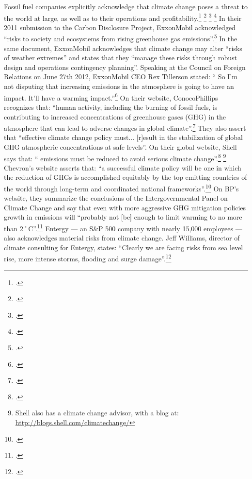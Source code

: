 
	

Fossil fuel companies explicitly acknowledge that climate change poses a threat to the world at large, as well as to their operations and profitability.\footcite[][]{FFcorpsPlanning} \footcite[][]{OilCosFearFI} \footcite[][]{DemiseOfCrudeDenial} \footcite[][]{DoTheOpposite}
In their 2011 submission to the Carbon Disclosure Project, ExxonMobil acknowledged ``risks to society and ecosystems from rising greenhouse gas emissions''.\footcite[][]{ExxonCDP2011}
In the same document, ExxonMobil acknowledges that climate change may alter ``risks of weather extremes'' and states that they ``manage these risks through robust design and operations contingency planning''.
Speaking at the Council on Foreign Relations on June 27th 2012, ExxonMobil CEO Rex Tillerson stated: `` So I'm not disputing that increasing  emissions in the atmosphere is going to have an impact. It'll have a warming impact.''\footcite[][]{Tillerson}
On their website, ConocoPhillips recognizes that: ``human activity, including the burning of fossil fuels, is contributing to increased concentrations of greenhouse gases (GHG) in the atmosphere that can lead to adverse changes in global climate''.\footcite[][]{ConocoPhillipsCC}
They also assert that ``effective climate change policy must... [r]esult in the stabilization of global GHG atmospheric concentrations at safe levels''.
On their global website, Shell says that: `` emissions must be reduced to avoid serious climate change''.\footcite[][]{ShellClimateChange} \footnote{Shell also has a climate change advisor, with a blog at: \url{http://blogs.shell.com/climatechange/}}
Chevron's website asserts that: ``a successful climate policy will be one in which the reduction of GHGs is accomplished equitably by the top emitting countries of the world through long-term and coordinated national frameworks''.\footcite[][]{}
On BP's website, they summarize the conclusions of the Intergovernmental Panel on Climate Change and say that even with more aggressive GHG mitigation policies growth in  emissions will ``probably not [be] enough to limit warming to no more than 2˚C''.\footcite[][]{BPClimateChange}
Entergy --- an S\&P 500 company with nearly 15,000 employees --- also acknowledges material risks from climate change.
Jeff Williams, director of climate consulting for Entergy, states: ``Clearly we are facing risks from sea level rise, more intense storms, flooding and surge damage''.\footcite[][]{ShiftToClimatePreparedness}


